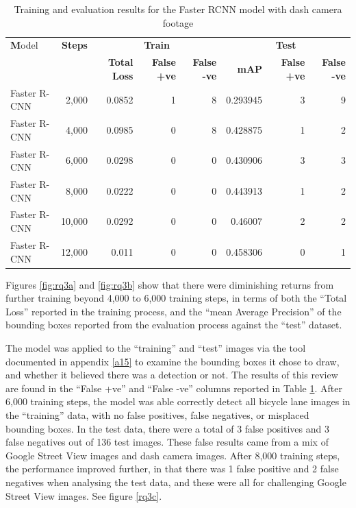 \documentclass[11pt,twoside]{report}
\begin{document}
\begin{table}[h]
\centering
\begin{tabular}{|l|r|r|r|r|r|r|r|}
\hline
\textbf Model & \textbf{Steps} & \multicolumn{3}{|c|}{\bfseries Train} & \multicolumn{3}{|c|}{\bfseries Test} \\
& & \textbf{Total Loss} & \textbf{False +ve} & \textbf{False -ve} & \textbf{mAP} & \textbf{False +ve} & \textbf{False -ve} \\
\hline
Faster R-CNN & 2,000 & 0.0852 & 1 & 8 & 0.293945 & 3 & 9 \\
Faster R-CNN & 4,000 & 0.0985 & 0 & 8 & 0.428875 & 1 & 2 \\
Faster R-CNN & 6,000 & 0.0298 & 0 & 0 & 0.430906 & 3 & 3 \\
Faster R-CNN & 8,000 & 0.0222 & 0 & 0 & 0.443913 & 1 & 2 \\
Faster R-CNN & 10,000 & 0.0292 & 0 & 0 & 0.46007 & 2 & 2 \\
Faster R-CNN & 12,000 & 0.011 & 0 & 0 & 0.458306 & 0 & 1 \\
\hline
\end{tabular}
\caption{Training and evaluation results for the Faster RCNN model with dash camera footage}
\label{table3}
\end{table}

Figures \ref{fig:rq3a} and \ref{fig:rq3b} show that there were diminishing returns from further training beyond 4,000 to 6,000 training steps, in terms of both the ``Total Loss'' reported in the training process, and the ``mean Average Precision'' of the bounding boxes reported from the evaluation process against the ``test'' dataset.

The model was applied to the ``training'' and ``test'' images via the tool documented in appendix \ref{a15} to examine the bounding boxes it chose to draw, and whether it believed there was a detection or not.  The results of this review are found in the ``False +ve'' and ``False -ve'' columns reported in Table \ref{table3}.  After 6,000 training steps, the model was able correctly detect all bicycle lane images in the ``training'' data, with no false positives, false negatives, or misplaced bounding boxes.  In the test data, there were a total of 3 false positives and 3 false negatives out of 136 test images.  These false results came from  a mix of Google Street View images and dash camera images.  After 8,000 training steps, the performance improved further, in that there was 1 false positive and 2 false negatives when analysing the test data, and these were all for challenging Google Street View images.  See figure \ref{rq3c}.
\end{document}
